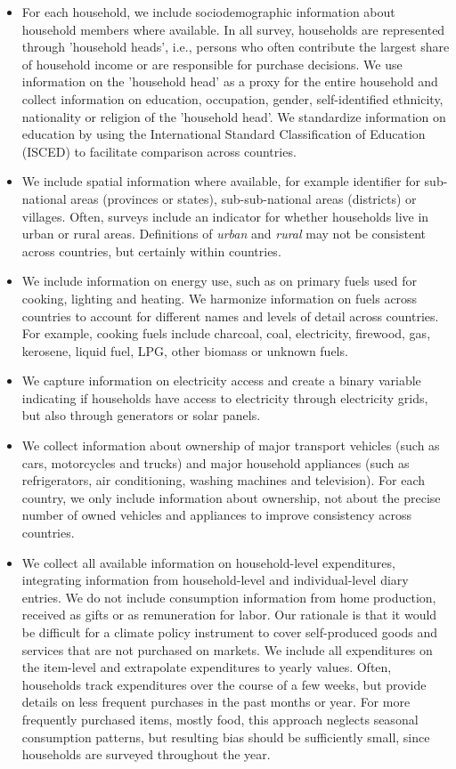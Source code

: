 \documentclass[12pt, a4paper]{article}
\begin{document}
\begin{refsection}
\begin{itemize}
    \item For each household, we include sociodemographic information about household members where available. In all survey, households are represented through 'household heads', i.e., persons who often contribute the largest share of household income or are responsible for purchase decisions. We use information on the 'household head' as a proxy for the entire household and collect information on education, occupation, gender, self-identified ethnicity, nationality or religion of the 'household head'. We standardize information on education by using the International Standard Classification of Education (ISCED) to facilitate comparison across countries.
    \item We include spatial information where available, for example identifier for sub-national areas (provinces or states), sub-sub-national areas (districts) or villages. Often, surveys include an indicator for whether households live in urban or rural areas. Definitions of \textit{urban} and \textit{rural} may not be consistent across countries, but certainly within countries.
    \item We include information on energy use, such as on primary fuels used for cooking, lighting and heating. We harmonize information on fuels across countries to account for different names and levels of detail across countries. For example, cooking fuels include charcoal, coal, electricity, firewood, gas, kerosene, liquid fuel, LPG, other biomass or unknown fuels.
    \item We capture information on electricity access and create a binary variable indicating if households have access to electricity through electricity grids, but also through generators or solar panels. 
    \item We collect information about ownership of major transport vehicles (such as cars, motorcycles and trucks) and major household appliances (such as refrigerators, air conditioning, washing machines and television). For each country, we only include information about ownership, not about the precise number of owned vehicles and appliances to improve consistency across countries.
    \item We collect all available information on household-level expenditures, integrating information from household-level and individual-level diary entries. We do not include consumption information from home production, received as gifts or as remuneration for labor. Our rationale is that it would be difficult for a climate policy instrument to cover self-produced goods and services that are not purchased on markets. We include all expenditures on the item-level and extrapolate expenditures to yearly values. Often, households track expenditures over the course of a few weeks, but provide details on less frequent purchases in the past months or year. For more frequently purchased items, mostly food, this approach neglects seasonal consumption patterns, but resulting bias should be sufficiently small, since households are surveyed throughout the year.

\end{itemize}
\end{refsection}
\end{document}
